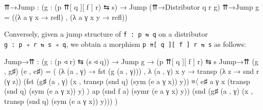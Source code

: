 \documentclass[
  11pt,
  oneside,
  article]{memoir}
\newenvironment{Shaded}{}{}
\newcommand{\NormalTok}[1]{#1}
\newcommand{\OtherTok}[1]{\textcolor[rgb]{0.00,0.44,0.13}{#1}}
\theoremstyle{definition}
\theoremstyle{plain}
\newcommand{\0}{\textsf{0}}
\newcommand{\1}{\tn{\textsf{1}}}
\begin{document}
\begin{Shaded}
\begin{Highlighting}[]
\NormalTok{    ⇈→Jump }\OtherTok{:} \OtherTok{(}\NormalTok{g }\OtherTok{:} \OtherTok{(}\NormalTok{p ⇈[ q ][ f ] r}\OtherTok{)}\NormalTok{ ⇆ s}\OtherTok{)} \OtherTok{→}\NormalTok{ Jump }\OtherTok{(}\NormalTok{⇈→Distributor q r g}\OtherTok{)}
\NormalTok{    ⇈→Jump g }\OtherTok{=} \OtherTok{((λ}\NormalTok{ a γ x }\OtherTok{→}\NormalTok{ refl}\OtherTok{)}\NormalTok{ , }\OtherTok{(λ}\NormalTok{ a γ x y }\OtherTok{→}\NormalTok{ refl}\OtherTok{))}
\end{Highlighting}
\end{Shaded}

Conversely, given a jump structure of \texttt{f\ :\ p\ ⇆\ q} on a
distributor \texttt{g\ :\ p\ ◃\ r\ ⇆\ s\ ◃\ q}, we obtain a morphism
\texttt{p\ ⇈{[}\ q\ {]}{[}\ f\ {]}\ r\ ⇆\ s} as follows:

\begin{Shaded}
\begin{Highlighting}[]
\NormalTok{    Jump→⇈ }\OtherTok{:} \OtherTok{(}\NormalTok{g }\OtherTok{:} \OtherTok{(}\NormalTok{p ◃ r}\OtherTok{)}\NormalTok{ ⇆ }\OtherTok{(}\NormalTok{s ◃ q}\OtherTok{))} \OtherTok{→}\NormalTok{ Jump g}
             \OtherTok{→} \OtherTok{(}\NormalTok{p ⇈[ q ][ f ] r}\OtherTok{)}\NormalTok{ ⇆ s}
\NormalTok{    Jump→⇈ }\OtherTok{(}\NormalTok{g , g♯}\OtherTok{)} \OtherTok{(}\NormalTok{e , e♯}\OtherTok{)} \OtherTok{=}
        \OtherTok{(} \OtherTok{(λ} \OtherTok{(}\NormalTok{a , γ}\OtherTok{)} \OtherTok{→}\NormalTok{ fst }\OtherTok{(}\NormalTok{g }\OtherTok{(}\NormalTok{a , γ}\OtherTok{)))} 
\NormalTok{        , }\OtherTok{λ} \OtherTok{(}\NormalTok{a , γ}\OtherTok{)}\NormalTok{ x y }
          \OtherTok{→}\NormalTok{ transp }\OtherTok{(λ}\NormalTok{ z }\OtherTok{→}\NormalTok{ snd r }\OtherTok{(}\NormalTok{γ z}\OtherTok{))}
                   \OtherTok{(}\NormalTok{fst }\OtherTok{(}\NormalTok{g♯ }\OtherTok{(}\NormalTok{a , γ}\OtherTok{)} \OtherTok{(}\NormalTok{x , transp }\OtherTok{(}\NormalTok{snd q}\OtherTok{)} \OtherTok{(}\NormalTok{sym }\OtherTok{(}\NormalTok{e a γ x}\OtherTok{))}\NormalTok{ y}\OtherTok{))} 
\NormalTok{                         ≡〈 e♯ a γ x }\OtherTok{(}\NormalTok{transp }\OtherTok{(}\NormalTok{snd q}\OtherTok{)} \OtherTok{(}\NormalTok{sym }\OtherTok{(}\NormalTok{e a γ x}\OtherTok{))}\NormalTok{ y}\OtherTok{)}\NormalTok{ 〉 }
\NormalTok{                         ap }\OtherTok{(}\NormalTok{snd f a}\OtherTok{)} \OtherTok{(}\NormalTok{symr }\OtherTok{(}\NormalTok{e a γ x}\OtherTok{)}\NormalTok{ y}\OtherTok{))}
                   \OtherTok{(}\NormalTok{snd }\OtherTok{(}\NormalTok{g♯ }\OtherTok{(}\NormalTok{a , γ}\OtherTok{)} \OtherTok{(}\NormalTok{x , transp }\OtherTok{(}\NormalTok{snd q}\OtherTok{)} \OtherTok{(}\NormalTok{sym }\OtherTok{(}\NormalTok{e a γ x}\OtherTok{))}\NormalTok{ y}\OtherTok{)))} \OtherTok{)}
\end{Highlighting}
\end{Shaded}
\end{document}
